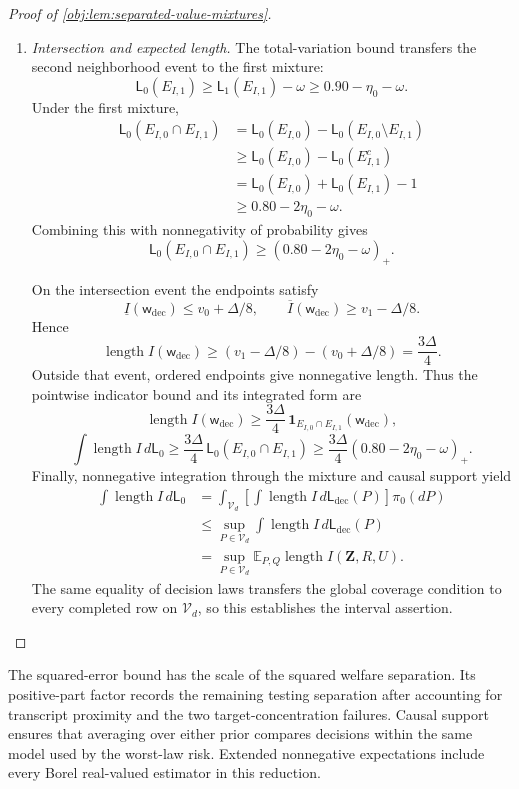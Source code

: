 \documentclass[11pt]{article}
\begin{document}
\begin{proof}[Proof of \cref{obj:lem:separated-value-mixtures}]
\begin{enumerate}
\item \textit{Intersection and expected length.}
The total-variation bound transfers the second neighborhood event to the first mixture:
\[
\mathsf L_0(E_{I,1})
\ge\mathsf L_1(E_{I,1})-\omega
\ge0.90-\eta_0-\omega.
\]
Under the first mixture,
\[
\begin{aligned}
\mathsf L_0(E_{I,0}\cap E_{I,1})
&=
\mathsf L_0(E_{I,0})
-\mathsf L_0(E_{I,0}\setminus E_{I,1})\\
&\ge
\mathsf L_0(E_{I,0})-\mathsf L_0(E_{I,1}^c)\\
&=
\mathsf L_0(E_{I,0})+\mathsf L_0(E_{I,1})-1\\
&\ge0.80-2\eta_0-\omega.
\end{aligned}
\]
Combining this with nonnegativity of probability gives
\[
\mathsf L_0(E_{I,0}\cap E_{I,1})
\ge(0.80-2\eta_0-\omega)_+.
\]

On the intersection event the endpoints satisfy
\[
\underline I(\mathsf w_{\mathrm{dec}})\le v_0+\Delta/8,
\qquad
\overline I(\mathsf w_{\mathrm{dec}})\ge v_1-\Delta/8.
\]
Hence
\[
\operatorname{length}I(\mathsf w_{\mathrm{dec}})
\ge
(v_1-\Delta/8)-(v_0+\Delta/8)
=\frac{3\Delta}{4}.
\]
Outside that event, ordered endpoints give nonnegative length. Thus the pointwise indicator bound and its integrated form are
\[
\operatorname{length}I(\mathsf w_{\mathrm{dec}})
\ge
\frac{3\Delta}{4}\,
\mathbf1_{E_{I,0}\cap E_{I,1}}(\mathsf w_{\mathrm{dec}}),
\]
\[
\int\operatorname{length}I\,d\mathsf L_0
\ge
\frac{3\Delta}{4}\,
\mathsf L_0(E_{I,0}\cap E_{I,1})
\ge
\frac{3\Delta}{4}(0.80-2\eta_0-\omega)_+.
\]
Finally, nonnegative integration through the mixture and causal support yield
\[
\begin{aligned}
\int\operatorname{length}I\,d\mathsf L_0
&=
\int_{\mathcal V_d}
\left[
\int\operatorname{length}I\,d\mathsf L_{\mathrm{dec}}(P)
\right]\pi_0(dP)\\
&\le
\sup_{P\in\mathcal V_d}
\int\operatorname{length}I\,d\mathsf L_{\mathrm{dec}}(P)\\
&=
\sup_{P\in\mathcal V_d}
\mathbb E_{P,Q}\operatorname{length}I(\mathbf Z,R,U).
\end{aligned}
\]
The same equality of decision laws transfers the global coverage condition to every completed row on \(\mathcal V_d\), so this establishes the interval assertion.
\end{enumerate}
\end{proof}

The squared-error bound has the scale of the squared welfare separation. Its positive-part factor records the remaining testing separation after accounting for transcript proximity and the two target-concentration failures. Causal support ensures that averaging over either prior compares decisions within the same model used by the worst-law risk. Extended nonnegative expectations include every Borel real-valued estimator in this reduction.
\end{document}
